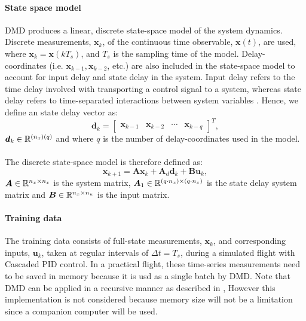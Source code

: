     \paragraph{State space model}
    DMD produces a linear, discrete state-space model of the system dynamics.
    Discrete measurements, $\bm{x}_k$, of the continuous time observable, $\bm{x}(t)$, are used, 
    where $\bm{x}_k = \bm{x}(k T_s)$, and $T_s$ is the sampling time of the model.    
    Delay-coordinates (i.e. $\bm{x}_{k-1}, \bm{x}_{k-2}$, etc.) are also included in the state-space model to
    account for input delay and state delay in the system.
    Input delay refers to the time delay involved with transporting a control signal to a system, 
    whereas state delay refers to time-separated interactions between system variables \cite{Chen1999}.
    Hence, we define an state delay vector as:
    \begin{equation}
        \bm{d}_{k} = 
        \begin{bmatrix}
            \bm{x}_{k-1} & \bm{x}_{k-2} & \cdots & \bm{x}_{k-q}
        \end{bmatrix}^T ,
    \end{equation}
    $\bm{d}_k \in \mathbb{R}^{(n_x)(q)}$ and where $q$ is the number of delay-coordinates used in the model.
    
    \paragraph{}
    The discrete state-space model is therefore defined as:
    \begin{equation} \label{eq:dmd_state_space}
        \bm{x}_{k+1} = \bm{A} \bm{x}_k + \bm{A}_d \bm{d}_k + \bm{B} \bm{u}_k ,
    \end{equation}
    \( \bm{A} \in \mathbb{R}^{n_x \times n_x} \) is the system matrix, 
    \( \bm{A}_1 \in \mathbb{R}^{(q \cdot n_x) \times (q \cdot n_x)} \) is the state delay system matrix and 
    \( \bm{B} \in \mathbb{R}^{n_x \times n_u} \) is the input matrix.
    
    \paragraph{Training data}
    The training data consists of full-state measurements, $\bm{x}_k$, and corresponding inputs, $\bm{u}_k$, 
    taken at regular intervals of $\Delta t = T_s$, during a simulated flight with Cascaded PID control.
    In a practical flight, these time-series measurements need to be saved in memory because it is usd as a single batch by DMD.
    Note that DMD can be applied in a recursive manner as described in \cite{Noack2016}, 
    However this implementation is not considered because memory size will not be a limitation since a companion computer will be used.
    
